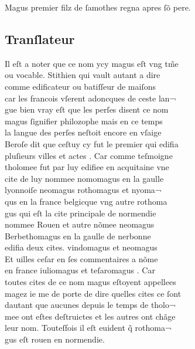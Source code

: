 \documentclass[12pt]{article}
\begin{document}
Magus premier filz de ſamothes regna apres ſõ pere.





\subsection*{Tranſlateur}


\newpage
Il eſt a noter que ce nom ycy magus eſt vng tm̃e\\
ou vocable. Stithien qui vault
          autant a dire\\
comme edificateur ou batiſſeur de maiſons\\
car les
          francois vſerent adoncques de ceste lan¬\\
gue bien vray eſt que les perſes disent
          ce nom\\
magus ſignifier philozophe mais en ce temps\\
la langue des
          perſes neſtoit encore en vſaige\\
Beroſe dit
          que ceſtuy cy fut le premier qui edifia\\
pluſieurs villes et actes . Car comme
            teſmoigne\\
tholomee fut par luy edifiee
          en acquitaine vne\\
cite de luy nommee nomomagus en la gaulle\\
lyonnoiſe neomagus rothomagus et nyoma¬\\
qus en la france belgicque vng autre
            rothoma\\
gus qui eſt la cite principale de normendie\\
nommee Rouen
          et autre nõmee neomagus\\
Berbethomagus en la gaulle de nerbonne\\
edifia deux cites. vindomagus et neomagus\\
Et uilles ceſar en ſes commentaires a nõme\\
en france
          iuliomagus et teſaromagus . Car\\
toutes cites de ce nom magus eſtoyent
            appellees\\
magez ie me de porte de dire quelles cites ce ſont\\
dautant que aucunes depuis le temps de tholo¬\\
mee ont eſtes deſtruictes et les autres ont chãge\\
leur nom.
          Touteſfois il eſt euident q̃ rothoma¬\\
gus eſt rouen en normendie.
\end{document}
